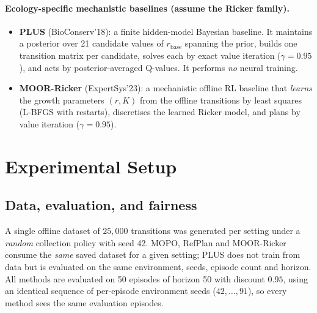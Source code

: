 \documentclass[11pt]{article}
\newcommand{\rbase}{r_{\mathrm{base}}}
\begin{document}
\paragraph{Ecology-specific mechanistic baselines (assume the Ricker family).}
\begin{itemize}
  \item \textbf{PLUS} (BioConserv'18): a finite hidden-model Bayesian baseline.
  It maintains a posterior over 21 candidate values of $\rbase$ spanning the
  prior, builds one transition matrix per candidate, solves each by exact value
  iteration ($\gamma = 0.95$), and acts by posterior-averaged Q-values. It
  performs \emph{no} neural training.
  \item \textbf{MOOR-Ricker} (ExpertSys'23): a mechanistic offline RL baseline
  that \emph{learns} the growth parameters $(r, K)$ from the offline transitions
  by least squares (L-BFGS with restarts), discretises the learned Ricker model,
  and plans by value iteration ($\gamma = 0.95$).
\end{itemize}

\section{Experimental Setup}

\subsection{Data, evaluation, and fairness}
A single offline dataset of $25{,}000$ transitions was generated per setting
under a \emph{random} collection policy with seed 42. MOPO, RefPlan and
MOOR-Ricker consume the \emph{same} saved dataset for a given setting; PLUS does
not train from data but is evaluated on the same environment, seeds, episode
count and horizon. All methods are evaluated on 50 episodes of horizon 50 with
discount $0.95$, using an identical sequence of per-episode environment seeds
($42,\dots,91$), so every method sees the same evaluation episodes.
\end{document}
